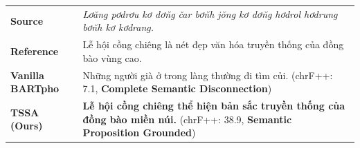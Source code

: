 \documentclass[11pt]{article}
\begin{document}
\begin{table}[!ht]
{\begin{tabular}{p{}p{}}
\textbf{Source} & \textit{Lơ\u{a}ng pơdrơu kơ dơ\u{n}g \v{c}ar bơ\u{n}h j\u{o}ng kơ dơ\u{n}g hơdrol hơdrung bơ\u{n}h kơ kơdrang.} \\
\textbf{Reference} & Lễ hội cồng chiêng là nét đẹp văn hóa truyền thống của đồng bào vùng cao. \\
\textbf{Vanilla BARTpho} & \textcolor{BrickRed}{Những người già ở trong làng thường đi tìm củi. (chrF++: 7.1, \textbf{Complete Semantic Disconnection})} \\
\textbf{TSSA (Ours)} & \textcolor{topgreen}{\textbf{Lễ hội cồng chiêng thể hiện bản sắc truyền thống của đồng bào miền núi.} (chrF++: 38.9, \textbf{Semantic Proposition Grounded})} \\
\bottomrule
\end{tabular}
}
\end{table}
\end{document}
